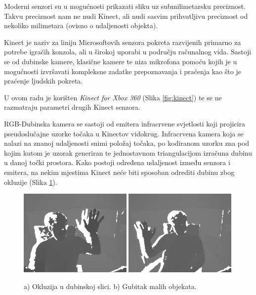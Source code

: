 \documentclass[times, utf8, diplomski, numeric]{fer}
\begin{document}
Moderni senzori su u mogućnosti prikazati sliku uz submilimetarsku preciznost. Takvu preciznost nam ne nudi Kinect, ali nudi sasvim prihvatljivu preciznost od nekoliko milimetara (ovisno o udaljenosti objekta).

Kinect je naziv za liniju Microsoftovih senzora pokreta razvijenih primarno za potrebe igraćih konzola, ali u širokoj uporabi u području računalnog vida. Sastoji se od dubinske kamere, klasične kamere te niza mikrofona pomoću kojih je u mogućnosti izvršavati kompleksne zadatke prepoznavanja i praćenja kao što je praćenje ljudskih pokreta.

U ovom radu je korišten \textit{Kinect for Xbox 360} \cite{kinect} (Slika \ref{fig:kinect}) te se ne razmatraju parametri drugih Kinect senzora.

RGB-Dubinska kamera se sastoji od emitera infracrvene svjetlosti koji projicira pseudoslučajne uzorke točaka u Kinectov vidokrug. Infracrvena kamera koja se nalazi na znanoj udaljenosti snimi položaj točaka, po kodiranom uzorku zna pod kojim kutom je uzorak generiran te jednostavnom triangulacijom izračuna dubinu u danoj točki prostora. Kako postoji određena udaljenost između senzora i emitera, na nekim mjestima Kinect neće biti sposoban odrediti dubinu zbog okluzije (Slika \ref{fig:oculsion}).

\begin{figure}[h!]
    \centering
    \includegraphics[width=0.49\textwidth]{detekcija/okluzija}    
    \includegraphics[width=0.49\textwidth]{detekcija/gubitak-malih-objekata}
	\caption{a) Okluzija u dubinskoj slici. b) Gubitak malih objekata.}
	\label{fig:oculsion}
\end{figure}
\end{document}
